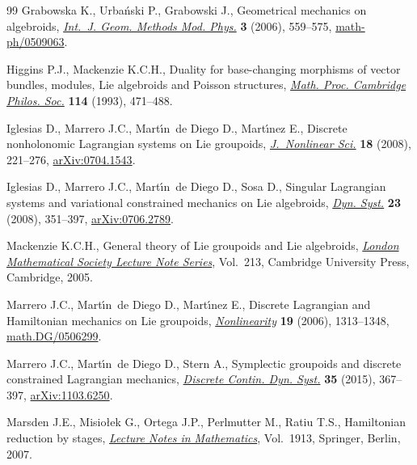 \documentclass[10pt,a4paper]{amsart}
\numberwithin{equation}{section}
\begin{document}
\begin{thebibliography}{99}
Grabowska K., Urba\'nski P., Grabowski J., Geometrical mechanics on algebroids,
 \href{https://doi.org/10.1142/S0219887806001259}{\textit{Int.~J. Geom. Methods Mod. Phys.}} \textbf{3} (2006), 559--575,
 \href{http://arxiv.org/abs/math-ph/0509063}{math-ph/0509063}.

Higgins P.J., Mackenzie K.C.H., Duality for base-changing morphisms of vector
 bundles, modules, {L}ie algebroids and {P}oisson structures, \href{https://doi.org/10.1017/S0305004100071760}{\textit{Math.
 Proc. Cambridge Philos. Soc.}} \textbf{114} (1993), 471--488.

Iglesias D., Marrero J.C., Mart\'{\i}n~de Diego D., Mart\'{\i}nez E., Discrete
 nonholonomic {L}agrangian systems on {L}ie groupoids, \href{https://doi.org/10.1007/s00332-007-9012-8}{\textit{J.~Nonlinear
 Sci.}} \textbf{18} (2008), 221--276, \href{http://arxiv.org/abs/0704.1543}{arXiv:0704.1543}.

Iglesias D., Marrero J.C., Mart\'{\i}n~de Diego D., Sosa D., Singular
 {L}agrangian systems and variational constrained mechanics on {L}ie
 algebroids, \href{https://doi.org/10.1080/14689360802294220}{\textit{Dyn. Syst.}} \textbf{23} (2008), 351--397,
 \href{http://arxiv.org/abs/0706.2789}{arXiv:0706.2789}.

Mackenzie K.C.H., General theory of {L}ie groupoids and {L}ie algebroids,
 \href{https://doi.org/10.1017/CBO9781107325883}{\textit{London Mathematical Society Lecture Note Series}}, Vol.~213, Cambridge
 University Press, Cambridge, 2005.

Marrero J.C., Mart\'{\i}n~de Diego D., Mart\'{\i}nez E., Discrete {L}agrangian
 and {H}amiltonian mechanics on {L}ie groupoids, \href{https://doi.org/10.1088/0951-7715/19/6/006}{\textit{Nonlinearity}}
 \textbf{19} (2006), 1313--1348, \href{http://arxiv.org/abs/math.DG/0506299}{math.DG/0506299}.

Marrero J.C., Mart\'{\i}n~de Diego D., Stern A., Symplectic groupoids and
 discrete constrained {L}agrangian mechanics, \href{https://doi.org/10.3934/dcds.2015.35.367}{\textit{Discrete Contin. Dyn.
 Syst.}} \textbf{35} (2015), 367--397, \href{http://arxiv.org/abs/1103.6250}{arXiv:1103.6250}.

Marsden J.E., Misio{\l}ek G., Ortega J.P., Perlmutter M., Ratiu T.S.,
 Hamiltonian reduction by stages, \href{https://doi.org/10.1007/978-3-540-72470-4}{\textit{Lecture Notes in Mathematics}}, Vol.~1913, Springer, Berlin, 2007.


\end{thebibliography}
\end{document}
